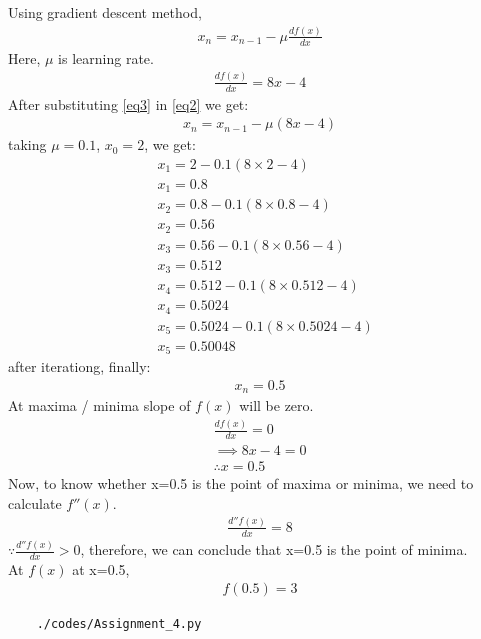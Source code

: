 \documentclass[journal,12pt,twocolumn]{IEEEtran}
\begin{document}
    Using gradient descent method,
    \begin{align}
    x_n=x_{n-1}-\mu\frac{df(x)}{dx} \label{eq2}
    \end{align}
    Here, $\mu$ is learning rate.\\
    \begin{align}
    \frac{df(x)}{dx}=8x-4 \label{eq3}
\end{align}
After substituting \ref{eq3} in \ref{eq2} we get:
\begin{align}
x_n=x_{n-1}-\mu( 8x-4)
\end{align}
taking $\mu=0.1$, $x_0=2$, we get:
\begin{align}
&x_1=2-0.1(8\times2-4)\\
&x_1=0.8\\
&x_2=0.8-0.1(8\times 0.8 -4)\\
&x_2=0.56\\
&x_3=0.56-0.1(8\times 0.56 -4)\\
&x_3=0.512\\
&x_4=0.512-0.1(8\times 0.512-4)\\
&x_4=0.5024\\
&x_5=0.5024-0.1(8\times 0.5024 -4)\\
&x_5=0.50048
\end{align}
after iterationg, finally:
    \begin{align}
    x_n=0.5
    \end{align}
At maxima / minima slope of $f(x)$ will be zero.
\begin{align}
    \frac{df(x)}{dx}=0\\
	\implies 8x-4=0\\
    \therefore x=0.5
\end{align}
Now, to know whether x=0.5 is the point of maxima or minima, we need to calculate $f''(x)$.
\begin{align}
    \frac{d''f(x)}{dx}=8
\end{align}
$\because   \frac{d''f(x)}{dx}>0$, therefore,  we can conclude that x=0.5 is the point of minima.\\
At $f(x)$ at x=0.5,
\begin{align}
    f(0.5)=3
\end{align}
	\begin{lstlisting}
	./codes/Assignment_4.py
	\end{lstlisting}
\end{document}
